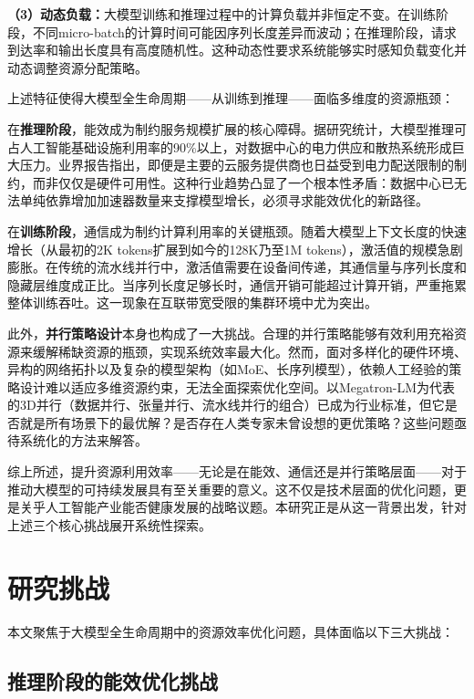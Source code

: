 \textbf{（3）动态负载：}大模型训练和推理过程中的计算负载并非恒定不变\cite{yu2022orca}。在训练阶段，不同micro-batch的计算时间可能因序列长度差异而波动；在推理阶段，请求到达率和输出长度具有高度随机性。这种动态性要求系统能够实时感知负载变化并动态调整资源分配策略。

上述特征使得大模型全生命周期——从训练到推理——面临多维度的资源瓶颈：

在\textbf{推理阶段}，能效成为制约服务规模扩展的核心障碍。据研究统计，大模型推理可占人工智能基础设施利用率的90\%以上\cite{desislavov2023trends}，对数据中心的电力供应和散热系统形成巨大压力。业界报告指出，即便是主要的云服务提供商也日益受到电力配送限制的制约，而非仅仅是硬件可用性\cite{patel2024characterizing}。这种行业趋势凸显了一个根本性矛盾：数据中心已无法单纯依靠增加加速器数量来支撑模型增长，必须寻求能效优化的新路径。

在\textbf{训练阶段}，通信成为制约计算利用率的关键瓶颈。随着大模型上下文长度的快速增长（从最初的2K tokens扩展到如今的128K乃至1M tokens），激活值的规模急剧膨胀\cite{chen2023longlora}。在传统的流水线并行中，激活值需要在设备间传递，其通信量与序列长度和隐藏层维度成正比。当序列长度足够长时，通信开销可能超过计算开销，严重拖累整体训练吞吐。这一现象在互联带宽受限的集群环境中尤为突出。

此外，\textbf{并行策略设计}本身也构成了一大挑战。合理的并行策略能够有效利用充裕资源来缓解稀缺资源的瓶颈，实现系统效率最大化\cite{zheng2022alpa}。然而，面对多样化的硬件环境、异构的网络拓扑以及复杂的模型架构（如MoE、长序列模型），依赖人工经验的策略设计难以适应多维资源约束，无法全面探索优化空间。以Megatron-LM为代表的3D并行（数据并行、张量并行、流水线并行的组合）已成为行业标准\cite{narayanan2021efficient}，但它是否就是所有场景下的最优解？是否存在人类专家未曾设想的更优策略？这些问题亟待系统化的方法来解答。

综上所述，提升资源利用效率——无论是在能效、通信还是并行策略层面——对于推动大模型的可持续发展具有至关重要的意义。这不仅是技术层面的优化问题，更是关乎人工智能产业能否健康发展的战略议题。本研究正是从这一背景出发，针对上述三个核心挑战展开系统性探索。

\section{研究挑战}

本文聚焦于大模型全生命周期中的资源效率优化问题，具体面临以下三大挑战：

\subsection{推理阶段的能效优化挑战}

